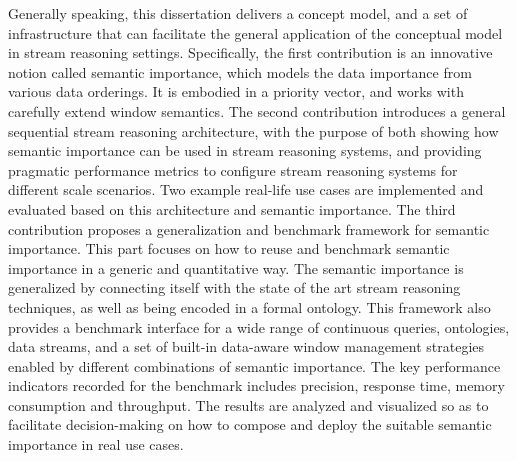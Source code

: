 Generally speaking, this dissertation delivers a concept model, and a set of infrastructure that can facilitate the general application of the conceptual model in stream reasoning settings. 
Specifically, the first contribution is an innovative notion called semantic importance, which models the data importance from various data orderings.
It is embodied in a priority vector, and works with carefully extend window semantics. 
The second contribution introduces a general sequential stream reasoning architecture, with the purpose of both showing how semantic importance can be used in stream reasoning systems, and providing pragmatic performance metrics to configure stream reasoning systems for different scale scenarios. 
Two example real-life use cases are implemented and evaluated based on this architecture and semantic importance. 
The third contribution proposes a generalization and benchmark framework for semantic importance. 
This part focuses on how to reuse and benchmark semantic importance in a generic and quantitative way.
The semantic importance is generalized by connecting itself with the state of the art stream reasoning techniques, as well as being encoded in a formal ontology. 
This framework also provides a benchmark interface for a wide range of continuous queries, ontologies, data streams, and a set of built-in data-aware window management strategies enabled by different combinations of semantic importance. 
The key performance indicators recorded for the benchmark includes precision, response time, memory consumption and throughput. 
The results are analyzed and visualized so as to facilitate decision-making on how to compose and deploy the suitable semantic importance in real use cases.
